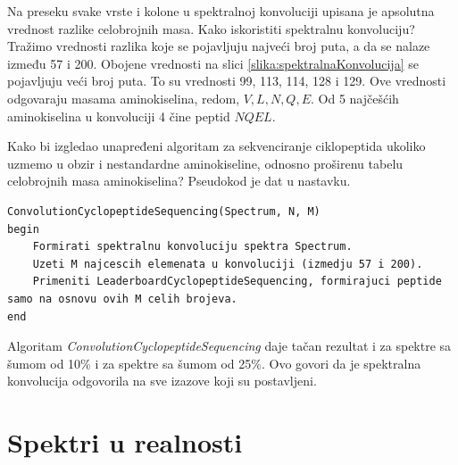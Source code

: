 \noindent Na preseku svake vrste i kolone u spektralnoj konvoluciji upisana je apsolutna vrednost razlike celobrojnih masa. Kako iskoristiti spektralnu konvoluciju? Tražimo vrednosti razlika koje se pojavljuju najveći broj puta, a da se nalaze između 57 i 200. Obojene vrednosti na slici \ref{slika:spektralnaKonvolucija} se pojavljuju veći broj puta. To su vrednosti 99, 113, 114, 128 i 129. Ove vrednosti odgovaraju masama aminokiselina, redom, $V, L, N, Q, E $. Od 5 najčešćih aminokiselina u konvoluciji 4 čine peptid $NQEL$.

Kako bi izgledao unapređeni algoritam za sekvenciranje ciklopeptida ukoliko uzmemo u obzir i nestandardne aminokiseline, odnosno proširenu tabelu celobrojnih masa aminokiselina? Pseudokod je dat u nastavku.
\begin{lstlisting}
ConvolutionCyclopeptideSequencing(Spectrum, N, M)
begin
	Formirati spektralnu konvoluciju spektra Spectrum.
	Uzeti M najcescih elemenata u konvoluciji (izmedju 57 i 200).
	Primeniti LeaderboardCyclopeptideSequencing, formirajuci peptide samo na osnovu ovih M celih brojeva.
end
\end{lstlisting}

Algoritam  \textit{ConvolutionCyclopeptideSequencing} daje tačan rezultat i za spektre sa šumom od 10\% i za spektre sa šumom od 25\%. Ovo govori da je spektralna konvolucija odgovorila na sve izazove koji su postavljeni.

\section{Spektri u realnosti}

